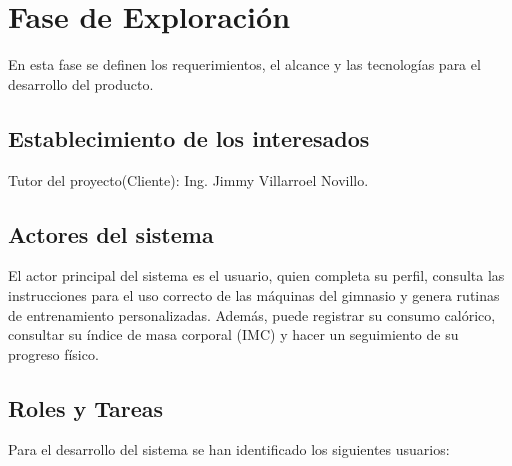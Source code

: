 \section{Fase de Exploración}
\label{sec:des-exploracion}

En esta fase se definen los requerimientos, el alcance y las tecnologías para el desarrollo
del producto.

\subsection{Establecimiento de los interesados}

Tutor del proyecto(Cliente): Ing. Jimmy Villarroel Novillo.

\subsection{Actores del sistema}

El actor principal del sistema es el usuario, quien completa su perfil,
consulta las instrucciones para el uso correcto de las máquinas del gimnasio y genera 
rutinas de entrenamiento personalizadas. Además, puede registrar su consumo
calórico, consultar su índice de masa corporal (IMC) y hacer un seguimiento
de su progreso físico.

\subsection{Roles y Tareas}

Para el desarrollo del sistema se han identificado los siguientes usuarios:


